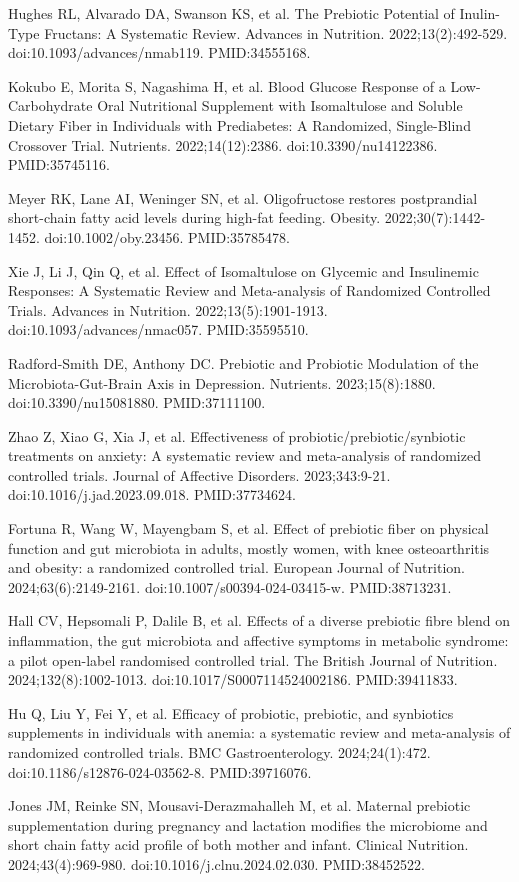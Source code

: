 \documentclass[11pt,oneside]{book}
\newcommand{\reff}[2]{\par\hangindent=7mm\hangafter=1\noindent[#1]\hspace{2mm}#2\par}
\begin{document}
\reff{20}{Hughes RL, Alvarado DA, Swanson KS, et al. The Prebiotic Potential of Inulin-Type Fructans: A Systematic Review. Advances in Nutrition. 2022;13(2):492-529. doi:10.1093/advances/nmab119. PMID:34555168.}
\reff{21}{Kokubo E, Morita S, Nagashima H, et al. Blood Glucose Response of a Low-Carbohydrate Oral Nutritional Supplement with Isomaltulose and Soluble Dietary Fiber in Individuals with Prediabetes: A Randomized, Single-Blind Crossover Trial. Nutrients. 2022;14(12):2386. doi:10.3390/nu14122386. PMID:35745116.}
\reff{22}{Meyer RK, Lane AI, Weninger SN, et al. Oligofructose restores postprandial short-chain fatty acid levels during high-fat feeding. Obesity. 2022;30(7):1442-1452. doi:10.1002/oby.23456. PMID:35785478.}
\reff{23}{Xie J, Li J, Qin Q, et al. Effect of Isomaltulose on Glycemic and Insulinemic Responses: A Systematic Review and Meta-analysis of Randomized Controlled Trials. Advances in Nutrition. 2022;13(5):1901-1913. doi:10.1093/advances/nmac057. PMID:35595510.}
\reff{24}{Radford-Smith DE, Anthony DC. Prebiotic and Probiotic Modulation of the Microbiota-Gut-Brain Axis in Depression. Nutrients. 2023;15(8):1880. doi:10.3390/nu15081880. PMID:37111100.}
\reff{25}{Zhao Z, Xiao G, Xia J, et al. Effectiveness of probiotic/prebiotic/synbiotic treatments on anxiety: A systematic review and meta-analysis of randomized controlled trials. Journal of Affective Disorders. 2023;343:9-21. doi:10.1016/j.jad.2023.09.018. PMID:37734624.}
\reff{26}{Fortuna R, Wang W, Mayengbam S, et al. Effect of prebiotic fiber on physical function and gut microbiota in adults, mostly women, with knee osteoarthritis and obesity: a randomized controlled trial. European Journal of Nutrition. 2024;63(6):2149-2161. doi:10.1007/s00394-024-03415-w. PMID:38713231.}
\reff{27}{Hall CV, Hepsomali P, Dalile B, et al. Effects of a diverse prebiotic fibre blend on inflammation, the gut microbiota and affective symptoms in metabolic syndrome: a pilot open-label randomised controlled trial. The British Journal of Nutrition. 2024;132(8):1002-1013. doi:10.1017/S0007114524002186. PMID:39411833.}
\reff{28}{Hu Q, Liu Y, Fei Y, et al. Efficacy of probiotic, prebiotic, and synbiotics supplements in individuals with anemia: a systematic review and meta-analysis of randomized controlled trials. BMC Gastroenterology. 2024;24(1):472. doi:10.1186/s12876-024-03562-8. PMID:39716076.}
\reff{29}{Jones JM, Reinke SN, Mousavi-Derazmahalleh M, et al. Maternal prebiotic supplementation during pregnancy and lactation modifies the microbiome and short chain fatty acid profile of both mother and infant. Clinical Nutrition. 2024;43(4):969-980. doi:10.1016/j.clnu.2024.02.030. PMID:38452522.}
\end{document}
